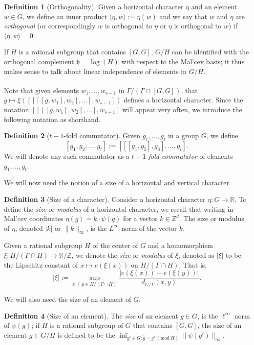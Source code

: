 \documentclass[11pt, a4paper]{amsart}
\newcommand{\nmod}[1]{~(\mathrm{mod}~#1)}
\theoremstyle{plain}
\theoremstyle{plain}
\theoremstyle{definition}
\newtheorem{definition}{Definition}
\theoremstyle{remark}
\numberwithin{equation}{section}
\numberwithin{lemma}{section}
\numberwithin{proposition}{section}
\numberwithin{corollary}{section}
\numberwithin{definition}{section}
\numberwithin{claim}{section}
\begin{document}
\begin{definition}[Orthogonality]
Given a horizontal character $\eta$ and an element $w \in G$, we define an inner product $\langle \eta, w \rangle := \eta(w)$ and we say that $w$ and $\eta$ are \emph{orthogonal} (or correspondingly $w$ is orthogonal to $\eta$ or $\eta$ is orthogonal to $w$) if $\langle \eta, w \rangle = 0$.
\end{definition}
If $H$ is a rational subgroup that contains $[G, G]$, $G/H$ can be identified with the orthogonal complement $\mathfrak{h} = \log(H)$ with respect to the Mal'cev basis; it thus makes sense to talk about linear independence of elements in $G/H$. \\\\
Note that given elements $w_1, \dots, w_{s - 1}$ in $\Gamma/(\Gamma \cap [G, G])$, that $g \mapsto \xi([[[[g, w_1], w_2], \dots], w_{s - 1}])$ defines a horizontal character. Since the notation $[[[[g, w_1], w_2], \dots], w_{s - 1}]$ will appear very often, we introduce the following notation as shorthand.
\begin{definition}[$t - 1$-fold commutator]
    Given $g_1, \dots, g_t$ in a group $G$, we define
    $$[g_1, g_2, \dots, g_t] := [[[g_1, g_2], g_3], \dots, g_t].$$
    We will denote any such commutator as a \emph{$t - 1$-fold commutator} of elements $g_1, \dots, g_t$.
\end{definition}
We will now need the notion of a size of a horizontal and vertical character.
\begin{definition}[Size of a character]
Consider a horizontal character $\eta\colon G \to \mathbb{R}$. To define the \emph{size} or \emph{modulus} of a horizontal character, we recall that writing in Mal'cev coordinates $\eta(g) = k \cdot \psi(g)$ for a vector $k \in \mathbb{Z}^d$. The size or modulus of $\eta$, denoted $|k|$ or $\|k\|_\infty$, is the $L^\infty$ norm of the vector $k$. 

Given a rational subgroup $H$ of the center of $G$ and a homomorphism $\xi\colon H/(\Gamma \cap H) \to \mathbb{R}/\mathbb{Z}$, we denote the \emph{size} or \emph{modulus} of $\xi$, denoted as $|\xi|$ to be the Lipschitz constant of $x \mapsto e(\xi(x))$ on $H/(\Gamma \cap H)$. That is,
$$|\xi| := \sup_{x \neq y \in H/(\Gamma \cap H)} \frac{|e(\xi(x)) - e(\xi(y))|}{d_{G/\Gamma}(x, y)}.$$    
\end{definition}
We will also need the size of an element of $G$.
\begin{definition}[Size of an element]
The \emph{size} of an element $g \in G$, is the $\ell^\infty$ norm of $\psi(g)$; if $H$ is a rational subgroup of $G$ that contains $[G, G]$, the size of an element $\overline{g} \in G/H$ is defined to be the $\inf_{g' \in G\colon \overline{g} = g'\nmod{H}} \|\psi(g')\|_\infty$.
\end{definition}
\end{document}
